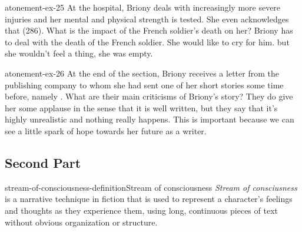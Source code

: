 \documentclass[preview]{standalone}
\begin{document}
\begin{snippetexercise}{atonement-ex-25}
    {At the hospital, Briony deals with increasingly more severe injuries and her mental and physical
    strength is tested. She even acknowledges that  (286). What is the impact of the French soldier's death on her?}
    Briony has to deal with the death of the French soldier. She would like to cry for him.
    but she wouldn't feel a thing, she was empty.
\end{snippetexercise}

\begin{snippetexercise}{atonement-ex-26}
    {At the end of the section, Briony receives a letter from the publishing company to whom she had
    sent one of her short stories some time before, namely . What are their
    main criticisms of Briony's story?}
    They do give her some applause in the sense that it is well written,
    but they say that it's highly unrealistic and nothing really happens.
    This is important because we can see a little spark of hope towards her future as a writer.
\end{snippetexercise}

\subsection{Second Part}

\begin{snippetdefinition}{stream-of-consciousness-definition}{Stream of consciousness}
    \textit{Stream of consciusness} is a narrative technique in fiction that is used to represent a character's
    feelings and thoughts as they experience them, using long, continuous pieces of text without
    obvious organization or structure.
\end{snippetdefinition}
\end{document}
